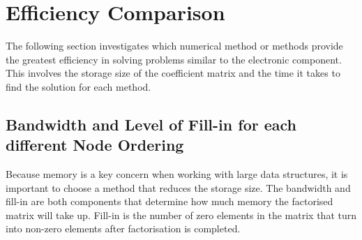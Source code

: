 \documentclass[12pt,a4paper]{article}
\begin{document}
\section{Efficiency Comparison}
The following section investigates which numerical method or methods provide the greatest efficiency in solving problems similar to the electronic component. This involves the storage size of the coefficient matrix and the time it takes to find the solution for each method.

\subsection{Bandwidth and Level of Fill-in for each different Node Ordering}
Because memory is a key concern when working with large data structures, it is important to choose a method that reduces the storage size. The bandwidth and fill-in are both components that determine how much memory the factorised matrix will take up. Fill-in is the number of zero elements in the matrix that turn into non-zero elements after factorisation is completed. 
\end{document}
